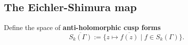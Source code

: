 









\subsection{The Eichler-Shimura map}
Define the space of \textbf{anti-holomorphic cusp forms}
\[\overline{S_k(\Gamma)} := \{z\mapsto \overline{f(z)}\mid f\in S_k(\Gamma)\}.\]

